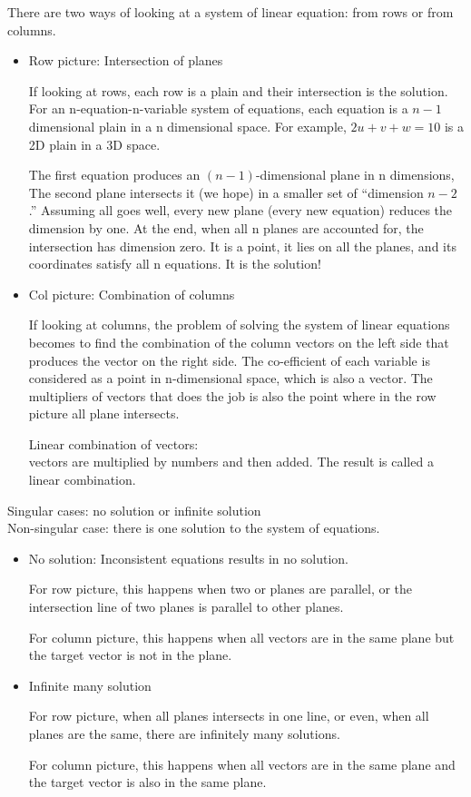 \documentclass[12pt]{article}
\begin{document}
There are two ways of looking at a system of linear equation: from
rows or from columns.
\begin{itemize}
\item Row picture: Intersection of planes

  If looking at rows, each row is a plain and their intersection is
  the solution. For an n-equation-n-variable system of equations, each
  equation is a $n - 1$ dimensional plain in a n dimensional
  space. For example, $2u + v + w = 10$ is a 2D plain in a 3D space.

  The first equation produces an $(n - 1)$-dimensional plane in n
  dimensions, The second plane intersects it (we hope) in a smaller
  set of ``dimension $n - 2$.'' Assuming all goes well, every new
  plane (every new equation) reduces the dimension by one. At the end,
  when all n planes are accounted for, the intersection has dimension
  zero. It is a point, it lies on all the planes, and its coordinates
  satisfy all n equations. It is the solution!

\item Col picture: Combination of columns

  If looking at columns, the problem of solving the system of linear
  equations becomes to find the combination of the column vectors on
  the left side that produces the vector on the right side. The
  co-efficient of each variable is considered as a point in
  n-dimensional space, which is also a vector. The multipliers of
  vectors that does the job is also the point where in the row picture
  all plane intersects.
    
  \begin{definition}
    Linear combination of vectors: \\vectors are multiplied by numbers
    and then added. The result is called a linear combination.
  \end{definition}
    
\end{itemize}
\begin{definition}
  Singular cases: no solution or infinite solution 
\\Non-singular case:
  there is one solution to the system of equations.
\end{definition}
\begin{itemize}
\item No solution: Inconsistent equations results in no solution.

  For row picture, this happens when two or planes are parallel, or
  the intersection line of two planes is parallel to other planes.
    
  For column picture, this happens when all vectors are in the same
  plane but the target vector is not in the plane.
\item Infinite many solution

  For row picture, when all planes intersects in one line, or even,
  when all planes are the same, there are infinitely many solutions.
    
  For column picture, this happens when all vectors are in the same
  plane and the target vector is also in the same plane.
\end{itemize}
\end{document}

